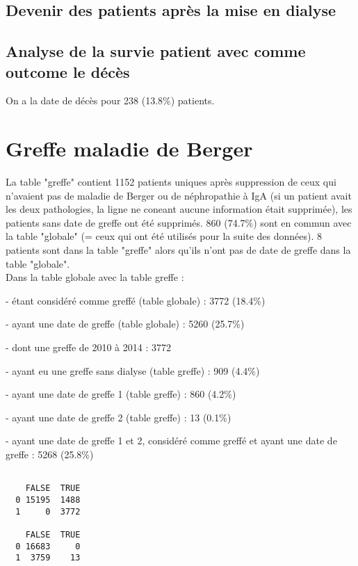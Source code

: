 \documentclass[11pt,a4paper]{article}\usepackage[]{graphicx}\usepackage[]{color}
\makeatletter
\newenvironment{kframe}{%
 \def\at@end@of@kframe{}%
 \ifinner\ifhmode%
  \def\at@end@of@kframe{\end{minipage}}%
  \begin{minipage}{\columnwidth}%
 \fi\fi%
 \def\FrameCommand##1{\hskip\@totalleftmargin \hskip-\fboxsep
 \colorbox{shadecolor}{##1}\hskip-\fboxsep
     \hskip-\linewidth \hskip-\@totalleftmargin \hskip\columnwidth}%
 \MakeFramed {\advance\hsize-\width
   \@totalleftmargin\z@ \linewidth\hsize
   \@setminipage}}%
 {\par\unskip\endMakeFramed%
 \at@end@of@kframe}
\newenvironment{knitrout}{}{} %
\makeatother
\begin{document}
  \subsection{Devenir des patients après la mise en dialyse}
  
  \subsection{Analyse de la survie patient avec comme outcome le décès}
  
  On a la date de décès pour 238 (13.8\%) patients.

  
\section{Greffe maladie de Berger}

La table "greffe" contient 1152 patients uniques après suppression de ceux qui n'avaient pas de maladie de Berger ou de néphropathie à IgA (si un patient avait les deux pathologies, la ligne ne coneant aucune information était supprimée), les patients sans date de greffe ont été supprimés. 860 (74.7\%) sont en commun avec la table "globale" (= ceux qui ont été utilisés pour la suite des données). 8 patients sont dans la table "greffe" alors qu'ils n'ont pas de date de greffe dans la table "globale".
~\\

Dans la table globale avec la table greffe :

- étant considéré comme greffé (table globale) : 3772 (18.4\%)

- ayant une date de greffe (table globale) : 5260 (25.7\%)

\qquad - dont une greffe de 2010 à 2014 : 3772

- ayant eu une greffe sans dialyse (table greffe) : 909 (4.4\%)

- ayant une date de greffe 1 (table greffe) : 860 (4.2\%)

- ayant une date de greffe 2 (table greffe) : 13 (0.1\%)

- ayant une date de greffe 1 et 2, considéré comme greffé et ayant une date de greffe : 5268 (25.8\%)

\begin{knitrout}
\color{fgcolor}\begin{kframe}
\begin{verbatim}
   
    FALSE  TRUE
  0 15195  1488
  1     0  3772
   
    FALSE  TRUE
  0 16683     0
  1  3759    13
\end{verbatim}
\end{kframe}
\end{knitrout}
\end{document}
